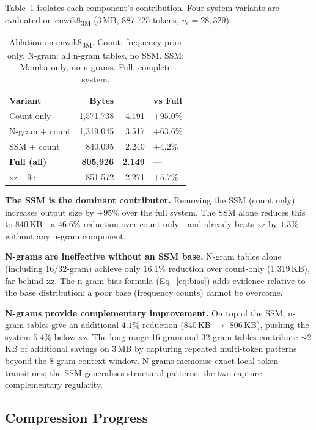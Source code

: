 \documentclass[10pt,twocolumn]{article}
\newcommand{\bpb}{\text{bpb}}
\begin{document}
Table~\ref{tab:ablation} isolates each component's contribution.
Four system variants are evaluated on enwik8\textsubscript{3M}
(3\,MB, 887{,}725 tokens, $v_e=28{,}329$).

\begin{table}[h]
\centering
\small
\caption{Ablation on enwik8\textsubscript{3M}.
  Count: frequency prior only.
  N-gram: all n-gram tables, no SSM.
  SSM: Mamba only, no n-grams.
  Full: complete system.}
\label{tab:ablation}
\begin{tabular}{@{}lrrl@{}}
\toprule
\textbf{Variant} & \textbf{Bytes} & \textbf{\bpb} & \textbf{vs Full} \\
\midrule
Count only               & 1,571,738 & 4.191 & $+95.0\%$ \\
N-gram + count           & 1,319,045 & 3.517 & $+63.6\%$ \\
SSM + count              &   840,095 & 2.240 &  $+4.2\%$ \\
\textbf{Full (all)}              & \textbf{805,926} & \textbf{2.149} & --- \\
\midrule
xz $-$9e                 &   851,572 & 2.271 &  $+5.7\%$ \\
\bottomrule
\end{tabular}
\end{table}

\textbf{The SSM is the dominant contributor.}
Removing the SSM (count only) increases output size by $+95\%$ over
the full system.  The SSM alone reduces this to 840\,KB---a
$\mathbf{46.6\%}$ reduction over count-only---and already beats xz
by $1.3\%$ without any n-gram component.

\textbf{N-grams are ineffective without an SSM base.}
N-gram tables alone (including 16/32-gram) achieve only $16.1\%$
reduction over count-only (1{,}319\,KB), far behind xz.  The n-gram
bias formula (Eq.~\ref{eq:bias}) adds evidence relative to the base
distribution; a poor base (frequency counts) cannot be overcome.

\textbf{N-grams provide complementary improvement.}
On top of the SSM, n-gram tables give an additional $4.1\%$ reduction
(840\,KB $\to$ 806\,KB), pushing the system $5.4\%$ below xz.
The long-range 16-gram and 32-gram tables contribute ${\sim}2$\,KB
of additional savings on 3\,MB by capturing repeated multi-token
patterns beyond the 8-gram context window.
N-grams memorise exact local token transitions; the SSM generalises
structural patterns: the two capture complementary regularity.

\subsection{Compression Progress}
\label{sec:progress}
\end{document}
